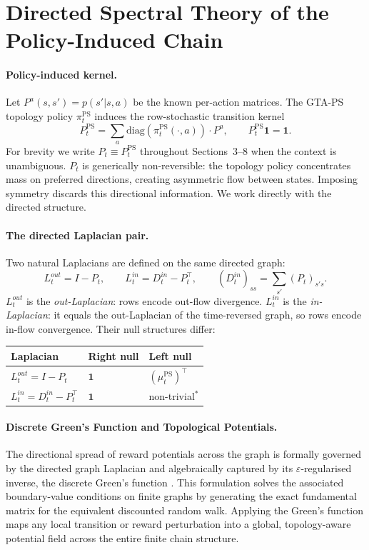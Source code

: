 \documentclass[10pt,a4paper]{article}
\begin{document}
\section{Directed Spectral Theory of the Policy-Induced Chain}


\paragraph{Policy-induced kernel.}
Let $P^a(s,s')=p(s'|s,a)$ be the known per-action matrices. The GTA-PS topology policy $\pi^{\mathrm{PS}}_t$ induces the row-stochastic transition kernel
\[
  P^{\mathrm{PS}}_t = \sum_a \mathrm{diag}(\pi^{\mathrm{PS}}_t(\cdot,a))\cdot P^a, \qquad P^{\mathrm{PS}}_t\mathbf{1}=\mathbf{1}.
\]
For brevity we write $P_t \equiv P^{\mathrm{PS}}_t$ throughout Sections~3--8 when the context is unambiguous.
$P_t$ is generically non-reversible: the topology policy concentrates mass on preferred directions,
creating asymmetric flow between states.  Imposing symmetry discards this directional
information.  We work directly with the directed structure.


\paragraph{The directed Laplacian pair.}
Two natural Laplacians are defined on the same directed graph:
\[
  L^{out}_t = I - P_t, \qquad L^{in}_t = D^{in}_t - P_t^\top,
  \qquad (D^{in}_t)_{ss} = \textstyle\sum_{s'} (P_t)_{s's}.
\]
$L^{out}_t$ is the \textit{out-Laplacian}: rows encode out-flow divergence.
$L^{in}_t$ is the \textit{in-Laplacian}: it equals the out-Laplacian of the
time-reversed graph, so rows encode in-flow convergence.
Their null structures differ:

\begin{center}\small
\begin{tabular}{lll}
\toprule
Laplacian & Right null & Left null \\
\midrule
$L^{out}_t = I - P_t$ & $\mathbf{1}$ & $(\mu^{\mathrm{PS}}_t)^\top$ \\
$L^{in}_t = D^{in}_t - P_t^\top$ & $\mathbf{1}$ & non-trivial$^*$ \\
\bottomrule
\end{tabular}
\end{center}

\paragraph{Discrete Green's Function and Topological Potentials.}
The directional spread of reward potentials across the graph is formally governed by the directed graph Laplacian and algebraically captured by its $\varepsilon$-regularised inverse, the discrete Green's function \citep{chung2000discrete}. This formulation solves the associated boundary-value conditions on finite graphs by generating the exact fundamental matrix for the equivalent discounted random walk. Applying the Green's function maps any local transition or reward perturbation into a global, topology-aware potential field across the entire finite chain structure.
\end{document}
